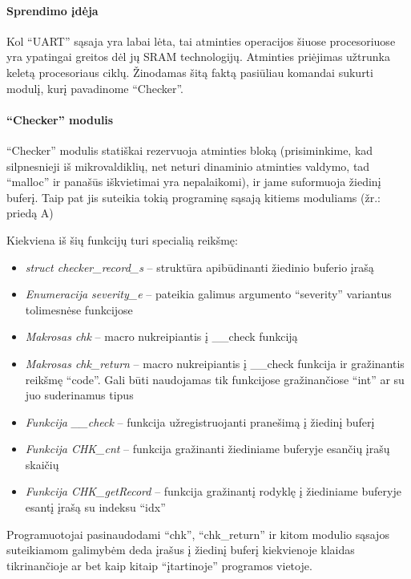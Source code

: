 \documentclass[12pt, a4paper, lithuanian, final]{article}
\begin{document}
\paragraph{Sprendimo įdėja}

Kol "`UART"' sąsaja yra labai lėta, tai atminties operacijos šiuose procesoriuose yra ypatingai greitos dėl jų SRAM technologijų.
Atminties priėjimas užtrunka keletą procesoriaus ciklų.
Žinodamas šitą faktą pasiūliau komandai sukurti modulį, kurį pavadinome "`Checker"'.


\paragraph{"`Checker"' modulis}
"`Checker"' modulis statiškai rezervuoja atminties bloką (prisiminkime, kad silpnesnieji iš mikrovaldiklių, net neturi dinaminio atminties valdymo, tad "`malloc"' ir panašūs iškvietimai yra nepalaikomi), ir jame suformuoja žiedinį buferį.
Taip pat jis suteikia tokią programinę sąsają kitiems moduliams (žr.: priedą A)

\vspace{3cm}

Kiekviena iš šių funkcijų turi specialią reikšmę:
\begin{itemize}
	\item \textit{struct checker\_record\_s} -- struktūra apibūdinanti žiedinio buferio įrašą
	\item \textit{Enumeracija severity\_e} -- pateikia galimus argumento "`severity"' variantus tolimesnėse funkcijose
	\item \textit{Makrosas chk} -- macro nukreipiantis į \_\_check funkciją
	\item \textit{Makrosas chk\_return} -- macro nukreipiantis į \_\_check funkcija ir gražinantis reikšmę "`code"'.
		Gali būti naudojamas tik funkcijose gražinančiose "`int"' ar su juo suderinamus tipus
	\item \textit{Funkcija \_\_check} -- funkcija užregistruojanti pranešimą į žiedinį buferį
	\item \textit{Funkcija CHK\_cnt} -- funkcija gražinanti žiediniame buferyje esančių įrašų skaičių
	\item \textit{Funkcija CHK\_getRecord} -- funkcija gražinantį rodyklę į žiediniame buferyje esantį įrašą su indeksu "`idx"'
\end{itemize}


Programuotojai pasinaudodami "`chk"', "`chk\_return"' ir kitom modulio sąsajos suteikiamom galimybėm deda įrašus į žiedinį buferį kiekvienoje klaidas tikrinančioje ar bet kaip kitaip "`įtartinoje"' programos vietoje.
\end{document}
